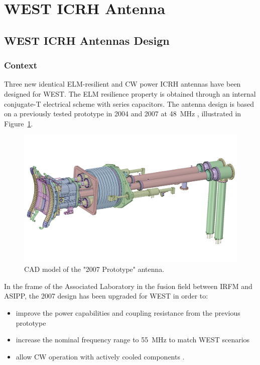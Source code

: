 \section{WEST ICRH Antenna}\label{eq:WEST_ICRF_work}


\subsection{WEST ICRH Antennas Design}\label{eq:WEST_ICRH_antenna}

\subsubsection{Context}
Three new identical ELM-resilient and CW power ICRH antennas have been designed for WEST. The ELM resilience property is obtained through an internal conjugate-T electrical scheme with series capacitors. The antenna design is based on a previously tested prototype in 2004 and 2007 at 48~MHz , illustrated in Figure~\ref{fig:proto2007antenna}. 

\begin{figure}[h]
	\centering
	\includegraphics[width=1.0\linewidth]{figures/chap3/WEST_ICRH/proto2007_antenna}
	\caption{CAD model of the "2007 Prototype" antenna.}
	\label{fig:proto2007antenna}
\end{figure}

In the frame of the Associated Laboratory in the fusion field between IRFM and ASIPP, the 2007 design has been upgraded for WEST in order to: 
\begin{itemize}
	\item improve the power capabilities and coupling resistance from the previous prototype   
	\item increase the nominal frequency range to 55~MHz to match WEST scenarios
	\item allow CW operation with actively cooled components .
\end{itemize} 

